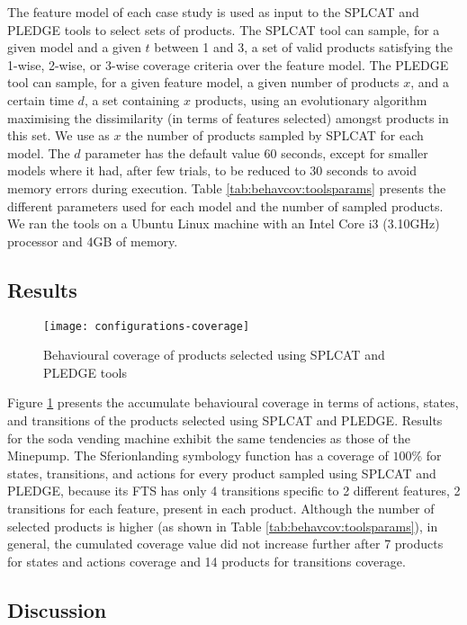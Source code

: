 The feature model of each case study is used as input to the SPLCAT and PLEDGE tools to select sets of products. The SPLCAT tool can sample, for a given model and a given $t$ between 1 and 3, a set of valid products satisfying the 1-wise, 2-wise, or 3-wise  coverage criteria over the feature model. The PLEDGE tool can sample, for a given feature model, a given number of products $x$, and a certain time $d$, a set containing $x$ products, using an evolutionary algorithm maximising the dissimilarity (in terms of features selected) amongst products in this set. We use as $x$ the number of products sampled by SPLCAT for each model. The $d$ parameter has the default value $60$ seconds, except for smaller models where it had, after few trials, to be reduced to $30$ seconds to avoid memory errors during execution. Table \ref{tab:behavcov:toolsparams} presents the different parameters used for each model and the number of sampled products. We ran the tools on a Ubuntu Linux machine with an Intel Core i3 (3.10GHz) processor and 4GB of memory.

\subsection{Results}

\begin{figure}
	\centering
	\texttt{[image: configurations-coverage]}
	\caption{Behavioural coverage of products selected using SPLCAT and PLEDGE tools}
	\label{fig:behavcov:results}
\end{figure}

Figure \ref{fig:behavcov:results} presents the accumulate behavioural coverage in terms of actions, states, and transitions of the products selected using SPLCAT and PLEDGE. 
%
Results for the soda vending machine exhibit the same tendencies as those of the Minepump. The Sferion\texttrademark landing symbology function has a coverage of $100\%$ for states, transitions, and actions for every product sampled using SPLCAT and PLEDGE, because its FTS has only 4 transitions specific to 2 different features, 2 transitions for each feature, present in each product.
%
Although the number of selected products is higher (as shown in Table \ref{tab:behavcov:toolsparams}), in general, the cumulated coverage value did not increase further after 7 products for states and actions coverage and 14 products for transitions coverage.

\subsection{Discussion}


